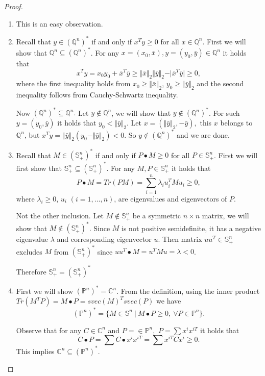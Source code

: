 \documentclass[12pt]{book}
\theoremstyle{definition}
\begin{document}
\begin{appendix}
\begin{proof}
\begin{enumerate}
\item This is an easy observation.
\item Recall that $y\in(\mathbb{Q}^n)^*$ if and only if $x^Ty \geq 0$ for all $x\in\mathbb{Q}^n$. First we will show that $\mathbb{Q}^n \subseteq (\mathbb{Q}^n)^*$. For any $x = (x_0,\bar{x}),y=(y_0,\bar{y})\in \mathbb{Q}^n $ it holds that
$$ x^Ty = x_0y_0 + \bar{x}^T\bar{y} \geq \Vert \bar{x}\Vert_2 \Vert \bar{y}\Vert_2 - \vert \bar{x}^T\bar{y}\vert \geq 0,$$ where the first inequality holds from $x_0\geq \Vert \bar{x}\Vert_2$,  $y_0\geq \Vert \bar{y}\Vert_2$ and the second inequality follows from Cauchy-Schwartz inequality.

Now $(\mathbb{Q}^n)^* \subseteq \mathbb{Q}^n.$ Let $y\notin \mathbb{Q}^n$, we will show that $y\notin (\mathbb{Q}^n)^*$.
For such $y = (y_0,\bar{y})$ it holds that $y_0<\Vert \bar{y}\Vert_2$. Let $x = (\Vert \bar{y}\Vert_2, -\bar{y}),$ 
this $x$ belongs to $\mathbb{Q}^n$, but $x^Ty = \Vert \bar{y}\Vert_2(y_0-\Vert \bar{y}\Vert_2)<0$. So $y\notin (\mathbb{Q}^n)^*$ and we are done.

\item Recall that $M \in (\mathbb{S}^n_+)^*$ if and only if $P\bullet M \geq 0$ for all $P\in \mathbb{S}^n_+$. First we will first show that $\mathbb{S}^n_+ \subseteq (\mathbb{S}^n_+)^*$. For any $M,P\in \mathbb{S}^n_+$ it holds that 
$$P\bullet M = Tr(PM) = \sum_{i=1}^n \lambda_iu_i^TMu_i \geq 0,$$
where $\lambda_i\geq 0$, $u_i$  $(i=1,\dots ,n)$, are eigenvalues and eigenvectors of $P$.

Not the other inclusion. Let $M\notin \mathbb{S}^n_+$ be a symmetric $n\times n$ matrix, we will show that $M\notin (\mathbb{S}^n_+)^*.$ Since $M$ is not positive semidefinite, it has a negative eigenvalue $\lambda$ and corresponding eigenvector $u$. Then matrix $uu^T\in \mathbb{S}^n_+$ excludes $M$ from $(\mathbb{S}^n_+)^*$ since $uu^T\bullet M = u^TMu = \lambda <0$.

Therefore $\mathbb{S}^n_+ = (\mathbb{S}^n_+)^*$

\item First we will show $(\mathbb{P}^n)^* = \mathbb{C}^n$. From the definition, using the inner product $Tr(M^TP) = M \bullet P = svec(M)^T svec(P)$ we have
$$ (\mathbb{P}^n)^* = \{ M \in \mathbb{S}^n \ \vert \ M\bullet P\geq 0, \ \forall P\in \mathbb{P}^n \}. $$

Observe that for any $C\in \mathbb{C}^n$ and $P = \in \mathbb{P}^n,$ $P = \sum x^ix^{iT}$ it holds that 
$$ C\bullet P = \sum C\bullet x^ix^{iT} = \sum x^{iT}Cx^i \geq 0.$$
This implies $\mathbb{C}^n\subseteq (\mathbb{P}^n)^*$.


\end{enumerate}
\end{proof}
\end{appendix}
\end{document}
